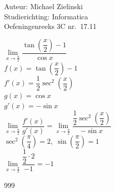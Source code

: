 \documentclass[a4paper]{article}
\begin{document}
\noindent \large Auteur: Michael Zielinski\\
\noindent \large Studierichting: Informatica\\
\noindent \large Oefeningenreeks 3C nr.\ 17.11\\
\medskip

\normalsize

$\lim\limits_{x \to \tfrac{\pi}{2}} 
      \dfrac{\tan\left(\dfrac{x}{2}\right)-1}{\cos x}$\\

$f(x)=\tan\left(\dfrac{x}{2}\right)-1$\\

$f'(x)=\dfrac{1}{2}\sec^{2}\left(\dfrac{x}{2}\right)$\\

$g(x)=\cos x$\\

$g'(x)=-\sin x$\\

$\lim\limits_{x \to \tfrac{\pi}{2}} 
      \dfrac{f'(x)}{g'(x)}
      =\lim\limits_{x \to \tfrac{\pi}{2}} 
        \dfrac{\dfrac{1}{2}\sec^{2}\left(\dfrac{x}{2}\right)}{-\sin x}$\\

$\sec^{2}\left(\dfrac{\pi}{4}\right)=2,\;
 \sin\left(\dfrac{\pi}{2}\right)=1$\\

$\lim\limits_{x \to \tfrac{\pi}{2}} 
      \dfrac{\dfrac{1}{2}\cdot 2}{-1}=-1$\\

\begin{thebibliography}{999}
\end{thebibliography}
\end{document}
